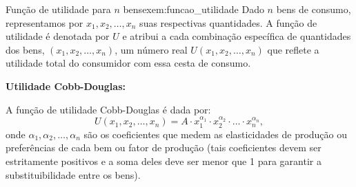 \begin{example}{Função de utilidade para $n$ bens}{exem:funcao_utilidade}
Dado \(n\) bens de consumo, representamos por \(x_1, x_2, \ldots, x_n\) suas respectivas quantidades. A função de utilidade é denotada por \(U\) e atribui a cada combinação específica de quantidades dos bens, \((x_1, x_2, \ldots, x_n)\), um número real \(U(x_1, x_2, \ldots, x_n)\) que reflete a utilidade total do consumidor com essa cesta de consumo. %

\textbf{Utilidade Cobb-Douglas:}\smallskip
{}

A função de utilidade Cobb-Douglas é dada por: 
\[ U(x_1, x_2, \ldots, x_n) = A \cdot x_1^{\alpha_1} \cdot x_2^{\alpha_2} \cdot \ldots \cdot x_n^{\alpha_n}, \]
onde 
\( \alpha_1, \alpha_2, \ldots, \alpha_n \) são os coeficientes que medem as elasticidades de produção ou preferências de cada bem ou fator de produção (tais coeficientes devem ser estritamente positivos e a soma deles deve ser menor que 1 para garantir a substituibilidade entre os bens). 





\end{example}

